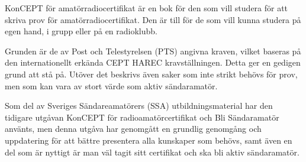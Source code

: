 \newpage
\AddToShipoutPicture*{\BackgroundPicLast}

\color{white}
KonCEPT för amatörradiocertifikat är en bok för den som vill studera för att
skriva prov för amatörradiocertifikat. Den är till för de som vill kunna studera
på egen hand, i grupp eller på en radioklubb.

Grunden är de av Post och Telestyrelsen (PTS) angivna kraven, vilket baseras på
den internationellt erkända CEPT HAREC kravställningen. Detta ger en gedigen
grund att stå på. Utöver det beskrivs även saker som inte strikt behövs för
prov, men som kan vara av stort värde som aktiv sändaramatör.

Som del av Sveriges Sändareamatörers (SSA) utbildningsmaterial har den tidigare
utgåvan KonCEPT för radioamatörcertifikat och Bli Sändaramatör använts, men
denna utgåva har genomgått en grundlig genomgång och uppdatering för att
bättre presentera alla kunskaper som behövs, samt även en del som är nyttigt
är man väl tagit sitt certifikat och ska bli aktiv sändaramatör.
